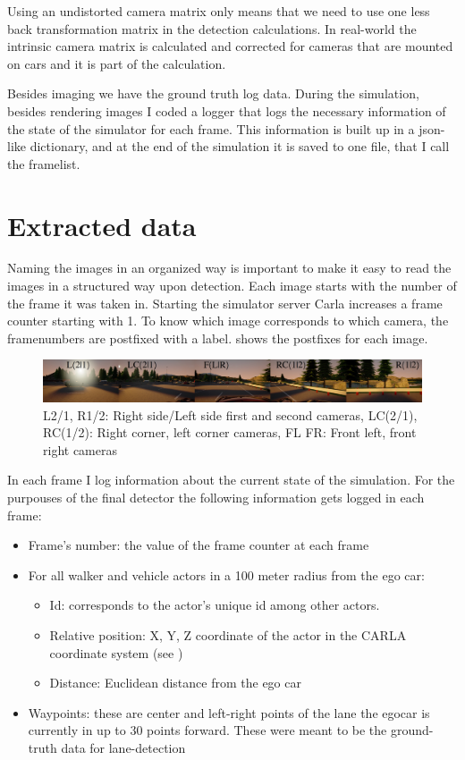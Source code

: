 Using an undistorted camera matrix only means that we need to use one less back
transformation matrix in the detection calculations. In real-world the intrinsic
camera matrix is calculated and corrected for cameras that are mounted on cars
and it is part of the calculation.

Besides imaging we have the ground truth log data. During the simulation,
besides rendering images I coded a logger that logs the necessary information of
the state of the simulator for each frame. This information is built up in a
json-like dictionary, and at the end of the simulation it is saved to one file,
that I call the framelist.

\section{Extracted data}

Naming the images in an organized way is important to make it easy to read the
images in a structured way upon detection. Each image starts with the number of
the frame it was taken in. Starting the simulator server Carla increases a
frame counter starting with 1. To know which image corresponds to which camera,
the framenumbers are postfixed with a label.  shows the
postfixes for each image.

\begin{figure}[!ht]
    \centering
    \includegraphics[width=150mm, keepaspectratio]{figures/labeling.jpg}
    \caption{L2/1, R1/2: Right side/Left side first and second cameras, LC(2/1), RC(1/2): Right corner, left corner cameras, FL FR: Front left, front right cameras}
    \label{fig:labeling}
\end{figure}

In each frame I log information about the current state of the simulation. For
the purpouses of the final detector the following information gets logged in each frame:
\begin{itemize}
    \item Frame's number: the value of the frame counter at each frame
    \item For all walker and vehicle actors in a 100 meter radius from the ego car:
          \begin{itemize}
              \item Id: corresponds to the actor's unique id among other actors.
              \item Relative position: X, Y, Z coordinate of the actor in the CARLA
                    coordinate system (see )
              \item Distance: Euclidean distance from the ego car
          \end{itemize}
    \item Waypoints: these are center and left-right points of the lane the egocar is currently in up
          to 30 points forward. These were meant to be the ground-truth data for
          lane-detection
\end{itemize}

